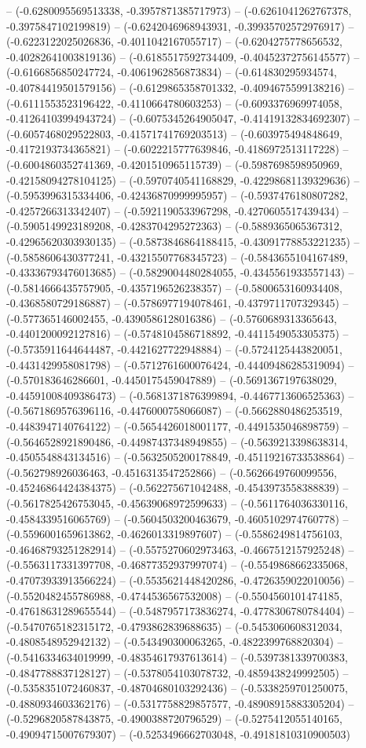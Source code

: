 -- (-0.6280095569513338, -0.3957871385717973) -- (-0.6261041262767378, -0.3975847102199819) -- (-0.6242046968943931, -0.39935702572976917) -- (-0.6223122025026836, -0.4011042167055717) -- (-0.6204275778656532, -0.40282641003819136) -- (-0.6185517592734409, -0.40452372756145577) -- (-0.6166856850247724, -0.4061962856873834) -- (-0.614830295934574, -0.40784419501579156) -- (-0.6129865358701332, -0.4094675599138216) -- (-0.6111553523196422, -0.4110664780603253) -- (-0.6093376969974058, -0.41264103994943724) -- (-0.6075345264905047, -0.41419132834692307) -- (-0.6057468029522803, -0.41571741769203513) -- (-0.603975494848649, -0.4172193734365821) -- (-0.6022215777639846, -0.4186972513117228) -- (-0.6004860352741369, -0.4201510965115739) -- (-0.5987698598950969, -0.42158094278104125) -- (-0.5970740541168829, -0.42298681139329636) -- (-0.5953996315334406, -0.42436870999995957) -- (-0.5937476180807282, -0.4257266313342407) -- (-0.5921190533967298, -0.4270605517439434) -- (-0.5905149923189208, -0.4283704295272363) -- (-0.5889365065367312, -0.42965620303930135) -- (-0.5873846864188415, -0.43091778853221235) -- (-0.5858606430377241, -0.43215507768345723) -- (-0.5843655104167489, -0.43336793476013685) -- (-0.5829004480284055, -0.4345561933557143) -- (-0.5814666435757905, -0.4357196526238357) -- (-0.5800653160934408, -0.4368580729186887) -- (-0.5786977194078461, -0.4379711707329345) -- (-0.577365146002455, -0.4390586128016386) -- (-0.5760689313365643, -0.4401200092127816) -- (-0.5748104586718892, -0.4411549053305375) -- (-0.5735911644644487, -0.4421627722948884) -- (-0.5724125443820051, -0.4431429958081798) -- (-0.5712761600076424, -0.44409486285319094) -- (-0.570183646286601, -0.4450175459047889) -- (-0.5691367197638029, -0.44591008409386473) -- (-0.5681371876399894, -0.4467713606525363) -- (-0.5671869576396116, -0.4476000758066087) -- (-0.5662880486253519, -0.4483947140764122) -- (-0.5654426018001177, -0.4491535046898759) -- (-0.5646528921890486, -0.44987437348949855) -- (-0.5639213398638314, -0.4505548843134516) -- (-0.5632505200178849, -0.45119216733538864) -- (-0.562798926036463, -0.4516313547252866) -- (-0.5626649760099556, -0.45246864424384375) -- (-0.562275671042488, -0.4543973558388839) -- (-0.5617825426753045, -0.45639068972599633) -- (-0.5611764036330116, -0.4584339516065769) -- (-0.5604503200463679, -0.4605102974760778) -- (-0.5596001659613862, -0.4626013319897607) -- (-0.5586249814756103, -0.46468793251282914) -- (-0.5575270602973463, -0.4667512157925248) -- (-0.5563117331397708, -0.46877352937997074) -- (-0.5549868662335068, -0.47073933913566224) -- (-0.5535621448420286, -0.4726359022010056) -- (-0.5520482455786988, -0.4744536567532008) -- (-0.5504560101474185, -0.47618631289655544) -- (-0.5487957173836274, -0.4778306780784404) -- (-0.5470765182315172, -0.4793862839688635) -- (-0.5453060608312034, -0.4808548952942132) -- (-0.543490300063265, -0.4822399768820304) -- (-0.5416334634019999, -0.48354617937613614) -- (-0.5397381339700383, -0.4847788837128127) -- (-0.5378054103078732, -0.4859438249992505) -- (-0.5358351072460837, -0.48704680103292436) -- (-0.5338259701250075, -0.4880934603362176) -- (-0.5317758829857577, -0.48908915883305204) -- (-0.5296820587843875, -0.4900388720796529) -- (-0.5275412055140165, -0.49094715007679307) -- (-0.5253496662703048, -0.49181810310900503) 
